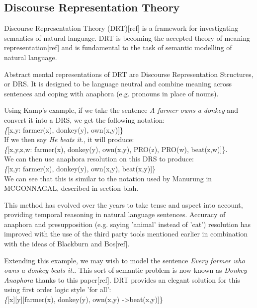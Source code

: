 
\subsection{Discourse Representation Theory}
Discourse Representation Theory (DRT)[ref] is a framework for investigating semantics of natural language. DRT is becoming the accepted theory of meaning representation[ref] and is fundamental to the task of semantic modelling of natural language.

Abstract mental representations of DRT are Discourse Representation Structures, or DRS. It is designed to be language neutral and combine meaning across sentences and coping with anaphora (e.g. pronouns in place of nouns). 

Using Kamp's example, if we take the sentence \textit{A farmer owns a donkey} and convert it into a DRS, we get the following notation:\\
\textit\{[x,y: farmer(x), donkey(y), own(x,y)]\}\\

If we then say \textit{He beats it.}, it will produce:\\
\textit\{[x,y,z,w: farmer(x), donkey(y), own(x,y), PRO(z), PRO(w), beat(z,w)]\}.\\

We can then use anaphora resolution on this DRS to produce:\\
\textit\{[x,y: farmer(x), donkey(y), own(x,y), beat(x,y)]\}\\

We can see that this is similar to the notation used by Manurung in MCGONNAGAL, described in section blah.

This method has evolved over the years to take tense and aspect into account, providing temporal reasoning in natural language sentences. Accuracy of anaphora and presupposition (e.g. saying 'animal' instead of 'cat') resolution has improved with the use of the third party tools mentioned earlier in combination with the ideas of Blackburn and Bos[ref].

Extending this example, we may wish to model the sentence \textit{Every farmer who owns a donkey beats it.}. This sort of semantic problem is now known as \textit{Donkey Anaphora} thanks to this paper[ref]. DRT provides an elegant solution for this using first order logic style 'for all':\\
\textit\{[x][y][farmer(x), donkey(y), own(x,y) -\textgreater beat(x,y)]\}\\


